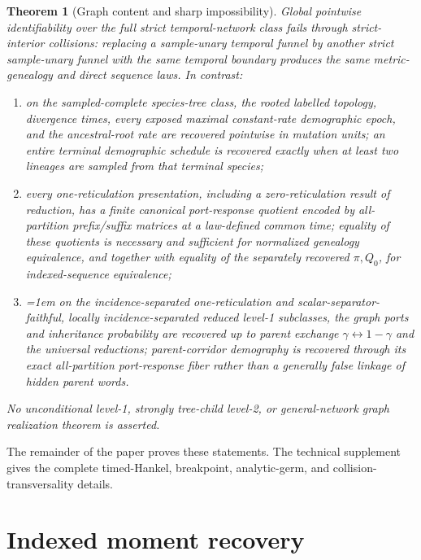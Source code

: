 \documentclass[11pt]{article}
\newtheorem{theorem}{Theorem}[section]
\begin{document}
\begin{theorem}[Graph content and sharp impossibility]
\label{thm:graph-summary}
Global pointwise identifiability over the full strict temporal-network class fails through strict-interior collisions: replacing a sample-unary temporal funnel by another strict sample-unary funnel with the same temporal boundary produces the same metric-genealogy and direct sequence laws.  In contrast:
\begin{enumerate}[label=(\roman*)]
\item on the sampled-complete species-tree class, the rooted labelled topology, divergence times, every exposed maximal constant-rate demographic epoch, and the ancestral-root rate are recovered pointwise in mutation units; an entire terminal demographic schedule is recovered exactly when at least two lineages are sampled from that terminal species;
\item every one-reticulation presentation, including a zero-reticulation result of reduction, has a finite canonical port-response quotient encoded by all-partition prefix/suffix matrices at a law-defined common time; equality of these quotients is necessary and sufficient for normalized genealogy equivalence, and together with equality of the separately recovered $\pi,Q_0$, for indexed-sequence equivalence;
\item \begingroup\emergencystretch=1em
on the incidence-separated one-reticulation and scalar-separator-faithful, locally incidence-separated reduced level-1 subclasses, the graph ports and inheritance probability are recovered up to parent exchange $\gamma\leftrightarrow1-\gamma$ and the universal reductions; parent-corridor demography is recovered through its exact all-partition port-response fiber rather than a generally false linkage of hidden parent words.\par\endgroup
\end{enumerate}
No unconditional level-1, strongly tree-child level-2, or general-network graph realization theorem is asserted.
\end{theorem}

The remainder of the paper proves these statements.  The technical supplement gives the complete timed-Hankel, breakpoint, analytic-germ, and collision-transversality details.

\section{Indexed moment recovery}
\label{sec:moment}
\end{document}
